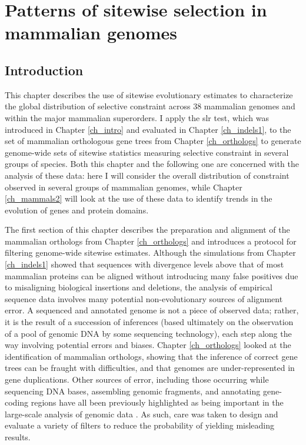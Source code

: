 \chapter{Patterns of sitewise selection in mammalian genomes}
\label{ch_mammals1}
\acresetall

\section{Introduction}

This chapter describes the use of sitewise evolutionary estimates to
characterize the global distribution of selective constraint across 38
mammalian genomes and within the major mammalian superorders. I apply
the \ac{slr} test, which was introduced in Chapter \ref{ch_intro} and
evaluated in Chapter \ref{ch_indels1}, to the set of mammalian
orthologous gene trees from Chapter \ref{ch_orthologs} to generate
genome-wide sets of sitewise statistics measuring selective constraint
in several groups of \mammln species. Both this chapter and the
following one are concerned with the analysis of these \sw data: here
I will consider the overall distribution of constraint observed in
several groups of mammalian genomes, while Chapter \ref{ch_mammals2}
will look at the use of these \sw data to identify trends in the
evolution of genes and protein domains.

The first section of this chapter describes the preparation and
alignment of the mammalian orthologs from Chapter \ref{ch_orthologs}
and introduces a protocol for filtering genome-wide sitewise
estimates. Although the simulations from Chapter \ref{ch_indels1}
showed that sequences with divergence levels above that of most
mammalian proteins can be aligned without introducing many false
positives due to misaligning biological insertions and deletions, the
analysis of empirical sequence data involves many potential
non-evolutionary sources of alignment error. A sequenced and annotated
genome is not a piece of observed data; rather, it is the result of a
succession of inferences (based ultimately on the observation of a
pool of genomic DNA by some sequencing technology), each step along
the way involving potential errors and biases. Chapter
\ref{ch_orthologs} looked at the identification of mammalian
orthologs, showing that the inference of correct gene trees can be
fraught with difficulties, and that \lcv genomes are under-represented
in gene duplications. Other sources of error, including those
occurring while sequencing DNA bases, assembling genomic fragments,
and annotating gene-coding regions have all been previously
highlighted as being important in the large-scale analysis of genomic
data \citep{TODO}. As such, care was taken to design and evaluate a
variety of filters to reduce the probability of yielding misleading
results.

